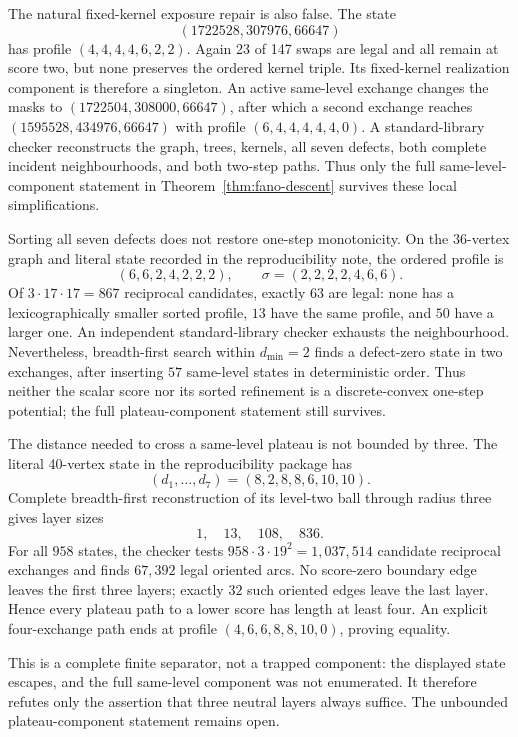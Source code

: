 \documentclass[11pt]{article}
\theoremstyle{definition}
\theoremstyle{remark}
\newcommand{\1}{\mathbf 1}
\begin{document}
The natural fixed-kernel exposure repair is also false.  The state
\[
                         (1722528,307976,66647)
\]
has profile \((4,4,4,4,6,2,2)\).  Again 23 of 147 swaps are legal and
all remain at score two, but none preserves the ordered kernel triple.
Its fixed-kernel realization component is therefore a singleton.  An
active same-level exchange changes the masks to
\((1722504,308000,66647)\), after which a second exchange reaches
\((1595528,434976,66647)\) with profile \((6,4,4,4,4,4,0)\).
A standard-library checker reconstructs the graph, trees, kernels, all
seven defects, both complete incident neighbourhoods, and both two-step
paths.  Thus only the full same-level-component statement in
Theorem~\ref{thm:fano-descent} survives these local simplifications.

Sorting all seven defects does not restore one-step monotonicity.  On the
36-vertex graph and literal state recorded in the reproducibility note, the
ordered profile is
\[
                         (6,6,2,4,2,2,2),
\qquad \sigma=(2,2,2,2,4,6,6).
\]
Of \(3\cdot17\cdot17=867\) reciprocal candidates, exactly \(63\) are legal:
none has a lexicographically smaller sorted profile, \(13\) have the same
profile, and \(50\) have a larger one.  An independent standard-library
checker exhausts the neighbourhood.  Nevertheless, breadth-first search
within \(d_{\min}=2\) finds a defect-zero state in two exchanges, after
inserting \(57\) same-level states in deterministic order.  Thus neither
the scalar score nor its sorted refinement is a discrete-convex one-step
potential; the full plateau-component statement still survives.

The distance needed to cross a same-level plateau is not bounded by three.
The literal 40-vertex state in the reproducibility package has
\[
                         (d_1,\ldots,d_7)=(8,2,8,8,6,10,10).
\]
Complete breadth-first reconstruction of its level-two ball through radius
three gives layer sizes
\[
                         1,\quad 13,\quad 108,\quad 836.
\]
For all \(958\) states, the checker tests
\(958\cdot3\cdot19^2=1{,}037{,}514\) candidate reciprocal exchanges and
finds \(67{,}392\) legal oriented arcs.  No score-zero boundary edge leaves
the first three layers; exactly \(32\) such oriented edges leave the last
layer.  Hence every plateau path to a lower score has length at least four.
An explicit four-exchange path ends at profile
\((4,6,6,8,8,10,0)\), proving equality.

This is a complete finite separator, not a trapped component: the displayed
state escapes, and the full same-level component was not enumerated.  It
therefore refutes only the assertion that three neutral layers always
suffice.  The unbounded plateau-component statement remains open.
\end{document}
